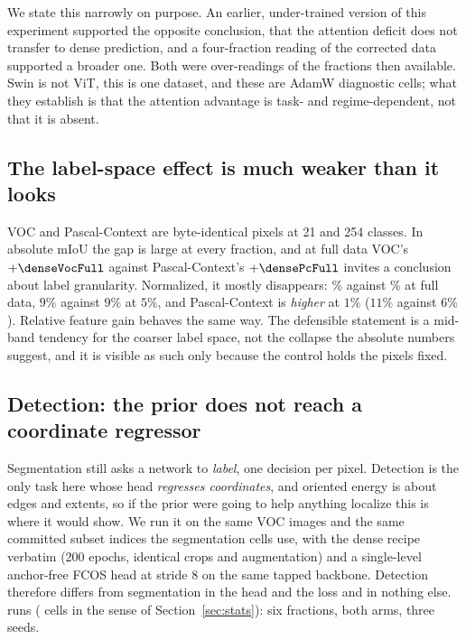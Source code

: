 We state this narrowly on purpose. An earlier, under-trained version of this
experiment supported the opposite conclusion, that the attention deficit does
not transfer to dense prediction, and a four-fraction reading
of the corrected data supported a broader one. Both were over-readings of the
fractions then available. Swin is not ViT, this is one dataset, and these are
AdamW diagnostic cells; what they establish is that the attention advantage
is task- and regime-dependent, not that it is absent.

\subsection{The label-space effect is much weaker than it looks}
VOC and Pascal-Context are byte-identical pixels at 21 and 254 classes. In
absolute mIoU the gap is large at every fraction, and at full data VOC's
$+\denseVocFull$ against Pascal-Context's $+\densePcFull$ invites a
conclusion about label granularity. Normalized, it mostly disappears:
\denseVocFullRel\% against \densePcFullRel\% at full data, $9\%$ against
$9\%$ at $5\%$, and Pascal-Context is \emph{higher} at $1\%$ ($11\%$ against
$6\%$). Relative feature gain behaves the same way. The defensible statement
is a mid-band tendency for the coarser label space, not the collapse the
absolute numbers suggest, and it is visible as such only because the control
holds the pixels fixed.

\subsection{Detection: the prior does not reach a coordinate
regressor}\label{sec:detection}
Segmentation still asks a network to \emph{label}, one decision per pixel.
Detection is the only task here whose head \emph{regresses coordinates}, and
oriented energy is about edges and extents, so if the prior were going to help
anything localize this is where it would show. We run it on the same VOC images
and the same committed subset indices the segmentation cells use, with the
dense recipe verbatim (200 epochs, identical crops and augmentation) and a
single-level anchor-free FCOS head at stride 8 on the same tapped backbone.
Detection therefore differs from segmentation in the head and the loss and in
nothing else. \detCells{} runs (\detCellCount{} cells in the sense of
Section~\ref{sec:stats}): six fractions, both arms, three seeds.

